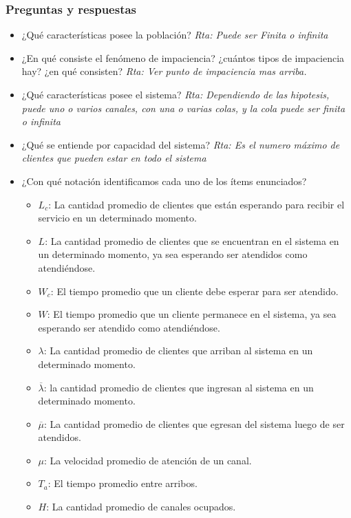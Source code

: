 \documentclass{article}
\begin{document}
\subsubsection{Preguntas y respuestas}
\begin{itemize}
    \item ¿Qué características posee la población?
        \textit{Rta: Puede ser Finita o infinita}
    \item ¿En qué consiste el fenómeno de impaciencia? ¿cuántos tipos de impaciencia hay? ¿en qué consisten?
        \textit{Rta: Ver punto de impaciencia mas arriba.}
    \item ¿Qué características posee el sistema?
        \textit{Rta: Dependiendo de las hipotesis, puede uno o varios canales, con una o varias colas, y la cola puede ser finita o infinita}
    \item ¿Qué se entiende por capacidad del sistema?
        \textit{Rta: Es el numero máximo de clientes que pueden estar en todo el sistema}
    \item ¿Con qué notación identificamos cada uno de los ítems enunciados?
        \begin{itemize}
            \item \(L_c\): La cantidad promedio de clientes que están esperando para recibir el servicio en un determinado momento.
            \item \(L\): La cantidad promedio de clientes que se encuentran en el sistema en un determinado momento, ya sea esperando ser atendidos como atendiéndose.
            \item \(W_c\): El tiempo promedio que un cliente debe esperar para ser atendido.
            \item \(W\): El tiempo promedio que un cliente permanece en el sistema, ya sea esperando ser atendido como atendiéndose.
            \item \(\lambda\): La cantidad promedio de clientes que arriban al sistema en un determinado momento.
            \item $\overline{\lambda}$: la cantidad promedio de clientes que ingresan al sistema en un determinado momento.
            \item $\overline{\mu}$: La cantidad promedio de clientes que egresan del sistema luego de ser atendidos.
            \item \(\mu\): La velocidad promedio de atención de un canal.
            \item \(T_a\): El tiempo promedio entre arribos.
            \item \(H\): La cantidad promedio de canales ocupados.

\end{itemize}
\end{itemize}
\end{document}
